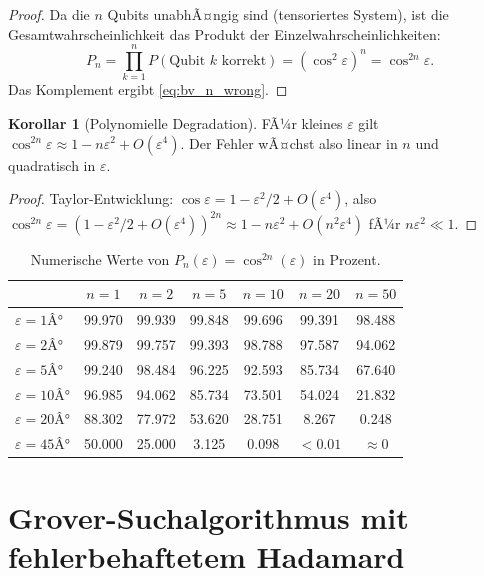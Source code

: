 ﻿\documentclass[11pt,a4paper]{article}
\theoremstyle{definition}
\newtheorem{corollary}[theorem]{Korollar}
\newcommand{\eps}{\varepsilon}
\begin{document}
\begin{proof}
  Da die $n$ Qubits unabhÃ¤ngig sind (tensoriertes System), ist die Gesamtwahrscheinlichkeit
  das Produkt der Einzelwahrscheinlichkeiten:
  \[
    P_n = \prod_{k=1}^{n} P(\text{Qubit } k \text{ korrekt}) = (\cos^2\eps)^n = \cos^{2n}\eps.
  \]
  Das Komplement ergibt \eqref{eq:bv_n_wrong}.
\end{proof}

\begin{corollary}[Polynomielle Degradation]
  FÃ¼r kleines $\eps$ gilt $\cos^{2n}\eps \approx 1 - n\eps^2 + O(\eps^4)$.
  Der Fehler wÃ¤chst also linear in $n$ und quadratisch in $\eps$.
\end{corollary}

\begin{proof}
  Taylor-Entwicklung: $\cos\eps = 1 - \eps^2/2 + O(\eps^4)$, also
  $\cos^{2n}\eps = (1-\eps^2/2+O(\eps^4))^{2n} \approx 1 - n\eps^2 + O(n^2\eps^4)$
  fÃ¼r $n\eps^2 \ll 1$.
\end{proof}

\begin{table}[H]
  \centering
  \caption{Numerische Werte von $P_n(\eps) = \cos^{2n}(\eps)$ in Prozent.}
  \label{tab:bv_table}
  \begin{tabular}{lcccccc}
    \toprule
    & $n=1$ & $n=2$ & $n=5$ & $n=10$ & $n=20$ & $n=50$ \\
    \midrule
    $\eps=1Â°$  & 99.970 & 99.939 & 99.848 & 99.696 & 99.391 & 98.488 \\
    $\eps=2Â°$  & 99.879 & 99.757 & 99.393 & 98.788 & 97.587 & 94.062 \\
    $\eps=5Â°$  & 99.240 & 98.484 & 96.225 & 92.593 & 85.734 & 67.640 \\
    $\eps=10Â°$ & 96.985 & 94.062 & 85.734 & 73.501 & 54.024 & 21.832 \\
    $\eps=20Â°$ & 88.302 & 77.972 & 53.620 & 28.751 &  8.267 &  0.248 \\
    $\eps=45Â°$ & 50.000 & 25.000 &  3.125 &  0.098 & $<0.01$ & $\approx 0$ \\
    \bottomrule
  \end{tabular}
\end{table}

\section{Grover-Suchalgorithmus mit fehlerbehaftetem Hadamard}
\label{sec:grover}
\end{document}
